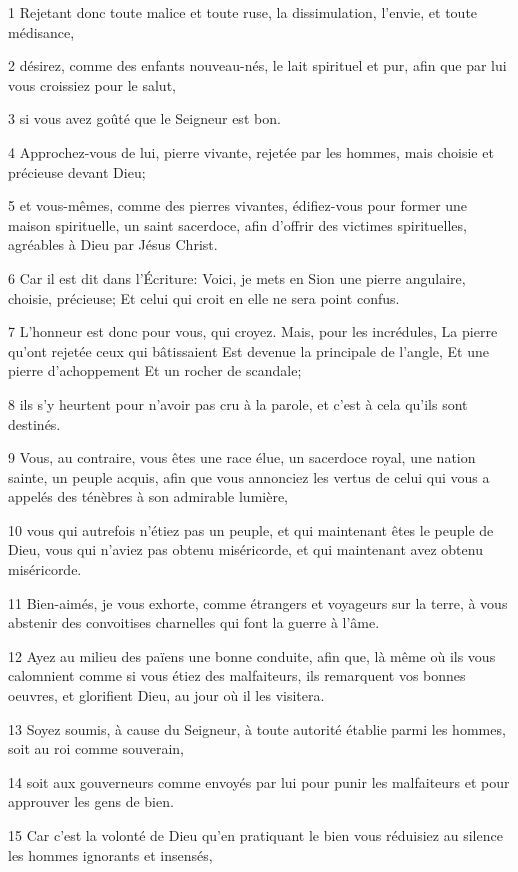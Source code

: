 \par 1 Rejetant donc toute malice et toute ruse, la dissimulation, l'envie, et toute médisance,
\par 2 désirez, comme des enfants nouveau-nés, le lait spirituel et pur, afin que par lui vous croissiez pour le salut,
\par 3 si vous avez goûté que le Seigneur est bon.
\par 4 Approchez-vous de lui, pierre vivante, rejetée par les hommes, mais choisie et précieuse devant Dieu;
\par 5 et vous-mêmes, comme des pierres vivantes, édifiez-vous pour former une maison spirituelle, un saint sacerdoce, afin d'offrir des victimes spirituelles, agréables à Dieu par Jésus Christ.
\par 6 Car il est dit dans l'Écriture: Voici, je mets en Sion une pierre angulaire, choisie, précieuse; Et celui qui croit en elle ne sera point confus.
\par 7 L'honneur est donc pour vous, qui croyez. Mais, pour les incrédules, La pierre qu'ont rejetée ceux qui bâtissaient Est devenue la principale de l'angle, Et une pierre d'achoppement Et un rocher de scandale;
\par 8 ils s'y heurtent pour n'avoir pas cru à la parole, et c'est à cela qu'ils sont destinés.
\par 9 Vous, au contraire, vous êtes une race élue, un sacerdoce royal, une nation sainte, un peuple acquis, afin que vous annonciez les vertus de celui qui vous a appelés des ténèbres à son admirable lumière,
\par 10 vous qui autrefois n'étiez pas un peuple, et qui maintenant êtes le peuple de Dieu, vous qui n'aviez pas obtenu miséricorde, et qui maintenant avez obtenu miséricorde.
\par 11 Bien-aimés, je vous exhorte, comme étrangers et voyageurs sur la terre, à vous abstenir des convoitises charnelles qui font la guerre à l'âme.
\par 12 Ayez au milieu des païens une bonne conduite, afin que, là même où ils vous calomnient comme si vous étiez des malfaiteurs, ils remarquent vos bonnes oeuvres, et glorifient Dieu, au jour où il les visitera.
\par 13 Soyez soumis, à cause du Seigneur, à toute autorité établie parmi les hommes, soit au roi comme souverain,
\par 14 soit aux gouverneurs comme envoyés par lui pour punir les malfaiteurs et pour approuver les gens de bien.
\par 15 Car c'est la volonté de Dieu qu'en pratiquant le bien vous réduisiez au silence les hommes ignorants et insensés,
